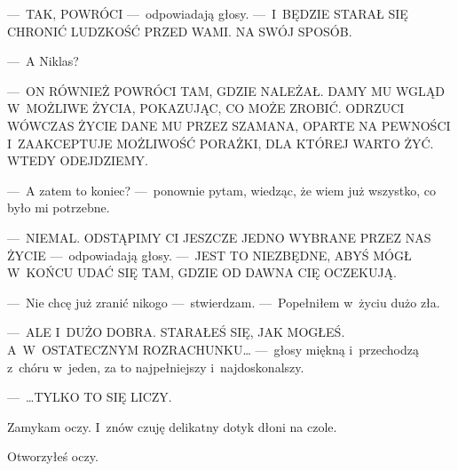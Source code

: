 ---~TAK, POWRÓCI ---~odpowiadają głosy. ---~I~BĘDZIE STARAŁ SIĘ CHRONIĆ LUDZKOŚĆ PRZED WAMI. NA SWÓJ SPOSÓB.

---~A Niklas?

---~ON RÓWNIEŻ POWRÓCI TAM, GDZIE NALEŻAŁ. DAMY MU WGLĄD W~MOŻLIWE ŻYCIA, POKAZUJĄC, CO MOŻE ZROBIĆ. ODRZUCI WÓWCZAS ŻYCIE DANE MU PRZEZ SZAMANA, OPARTE NA PEWNOŚCI I~ZAAKCEPTUJE MOŻLIWOŚĆ PORAŻKI, DLA KTÓREJ WARTO ŻYĆ. WTEDY ODEJDZIEMY.

---~A zatem to koniec? ---~ponownie pytam, wiedząc, że wiem już wszystko, co było mi potrzebne.

---~NIEMAL. ODSTĄPIMY CI JESZCZE JEDNO WYBRANE PRZEZ NAS ŻYCIE ---~odpowiadają głosy. ---~JEST TO NIEZBĘDNE, ABYŚ MÓGŁ W~KOŃCU UDAĆ SIĘ TAM, GDZIE OD DAWNA CIĘ OCZEKUJĄ.

---~Nie chcę już zranić nikogo ---~stwierdzam. ---~Popełniłem w~życiu dużo zła.

---~ALE I~DUŻO DOBRA. STARAŁEŚ SIĘ, JAK MOGŁEŚ. A~W~OSTATECZNYM ROZRACHUNKU… ---~głosy miękną i~przechodzą z~chóru w~jeden, za to najpełniejszy i~najdoskonalszy.

---~…TYLKO TO SIĘ LICZY.

Zamykam oczy. I~znów czuję delikatny dotyk dłoni na czole.

\paraSep

Otworzyłeś oczy.